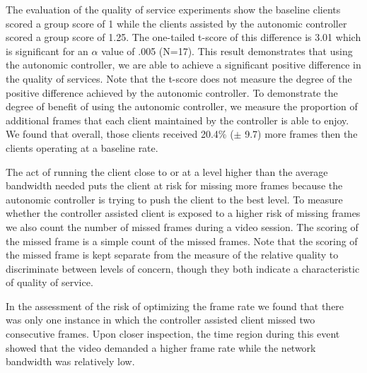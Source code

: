 \documentclass{sig-alternate}
\begin{document}
The evaluation of the quality of service experiments show the baseline
clients scored a group score of 1 while the clients assisted by the
autonomic controller scored a group score of 1.25.  The one-tailed
t-score of this difference is 3.01 which is significant for an
$\alpha$ value of .005 (N=17).  This result demonstrates that using
the autonomic controller, we are able to achieve a significant
positive difference in the quality of services.  Note that the t-score
does not measure the degree of the positive difference achieved by the
autonomic controller.  To demonstrate the degree of benefit of using
the autonomic controller, we measure the proportion of additional
frames that each client maintained by the controller is able to enjoy.
We found that overall, those clients received 20.4\% ($\pm$ 9.7) more
frames then the clients operating at a baseline rate.

The act of running the client close to or at a level higher than the
average bandwidth needed puts the client at risk for missing more
frames because the autonomic controller is trying to push the client to
the best level.  To measure whether the controller assisted client is
exposed to a higher risk of missing frames we also count the number of
missed frames during a video session.  The scoring of the missed frame
is a simple count of the missed frames.  Note that the scoring of the
missed frame is kept separate from the measure of the relative quality
to discriminate between levels of concern, though they both indicate a
characteristic of quality of service.


In the assessment of the risk of optimizing the frame rate we found
that there was only one instance in which the controller assisted
client missed two consecutive frames.  Upon closer inspection, the
time region during this event showed that the video demanded a higher
frame rate while the network bandwidth was relatively low.
\end{document}
